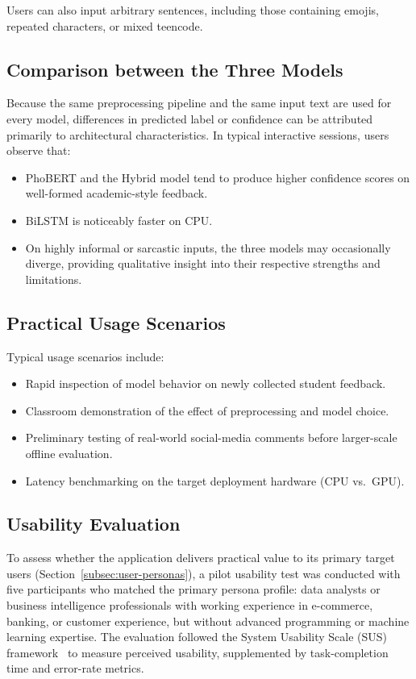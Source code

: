\documentclass[12pt]{report} %
\begin{document}
Users can also input arbitrary sentences, including those containing emojis, repeated characters, or mixed teencode.

\subsection{Comparison between the Three Models}

Because the same preprocessing pipeline and the same input text are used for every model, differences in predicted label or confidence can be attributed primarily to architectural characteristics. In typical interactive sessions, users observe that:
\begin{itemize}
    \item PhoBERT and the Hybrid model tend to produce higher confidence scores on well-formed academic-style feedback.
    \item BiLSTM is noticeably faster on CPU.
    \item On highly informal or sarcastic inputs, the three models may occasionally diverge, providing qualitative insight into their respective strengths and limitations.
\end{itemize}

\subsection{Practical Usage Scenarios}

Typical usage scenarios include:
\begin{itemize}
    \item Rapid inspection of model behavior on newly collected student feedback.
    \item Classroom demonstration of the effect of preprocessing and model choice.
    \item Preliminary testing of real-world social-media comments before larger-scale offline evaluation.
    \item Latency benchmarking on the target deployment hardware (CPU vs.\ GPU).
\end{itemize}

\subsection{Usability Evaluation}
\label{subsec:usability}

To assess whether the application delivers practical value to its primary target users (Section~\ref{subsec:user-personas}), a pilot usability test was conducted with five participants who matched the primary persona profile: data analysts or business intelligence professionals with working experience in e-commerce, banking, or customer experience, but without advanced programming or machine learning expertise. The evaluation followed the System Usability Scale (SUS) framework~\cite{brooke1996sus} to measure perceived usability, supplemented by task-completion time and error-rate metrics.
\end{document}
